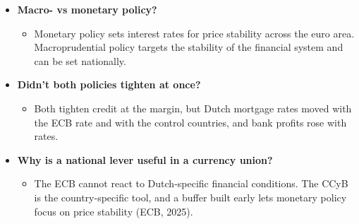 \documentclass[10pt]{article}
\begin{document}
\begin{tcolorbox}[sbox,width=0.495\linewidth,height=14.6cm,nobeforeafter,box align=top,fit basedim=11pt,colframe=nlred!70,colbacktitle=nlred!8,coltitle=nlred,title=LIKELY CHALLENGES · definitions and logic]
\begin{itemize}
\item[\textcolor{navy}{\textbf{Q}}] \textbf{Macro- vs monetary policy?}
\begin{itemize}
\item Monetary policy sets interest rates for price stability across the euro area. Macroprudential policy targets the stability of the financial system and can be set nationally.
\end{itemize}
\item[\textcolor{navy}{\textbf{Q}}] \textbf{Didn't both policies tighten at once?}
\begin{itemize}
\item Both tighten credit at the margin, but Dutch mortgage rates moved with the ECB rate and with the control countries, and bank profits rose with rates.
\end{itemize}
\item[\textcolor{navy}{\textbf{Q}}] \textbf{Why is a national lever useful in a currency union?}
\begin{itemize}
\item The ECB cannot react to Dutch-specific financial conditions. The CCyB is the country-specific tool, and a buffer built early lets monetary policy focus on price stability (ECB, 2025).
\end{itemize}
\end{itemize}
\end{tcolorbox}
\newpage
\end{document}
